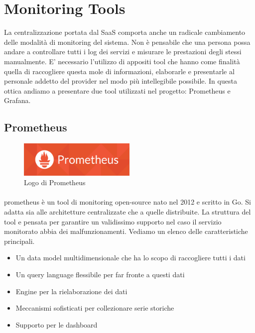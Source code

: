 \section{Monitoring Tools}
La centralizzazione portata dal SaaS comporta anche un radicale cambiamento delle modalità di monitoring del sistema. Non è pensabile che una persona possa andare a controllare tutti i log dei servizi e misurare le prestazioni degli stessi manualmente. E' necessario l'utilizzo di appositi tool che hanno come finalità quella di raccogliere questa mole di informazioni, elaborarle e presentarle al personale addetto del provider nel modo più intellegibile possibile. In questa ottica andiamo a presentare due tool utilizzati nel progetto: Prometheus e Grafana.
\subsection{Prometheus}
\begin{figure}[h!]
	\centering
	\includegraphics[width=0.5\textwidth,keepaspectratio=true]{capitoli/imgs/prometheuslogo.png}
	\caption{Logo di Prometheus}
\end{figure}
\paragraph{}
prometheus è un tool di monitoring open-source nato nel 2012 e scritto in Go. Si adatta sia alle architetture centralizzate che a quelle distribuite. La struttura del tool e pensata per garantire un validissimo supporto nel caso il servizio monitorato abbia dei malfunzionamenti. Vediamo un elenco delle caratteristiche principali.
\begin{itemize}
	\item Un data model multidimensionale che ha lo scopo di raccogliere tutti i dati
	\item Un query language flessibile per far fronte a questi dati
	\item Engine per la rielaborazione dei dati
	\item Meccanismi sofisticati per collezionare serie storiche
	\item Supporto per le dashboard
\end{itemize}
